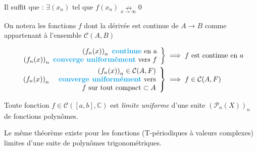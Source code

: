 \documentclass[11pt,a4paper,fleqn,pdftex]{report}
\begin{document}
\begin{theorem}
Il suffit que : 
$\exists (x_n)\text{ tel que }f(x_n)\underset{x\to{}\infty}{\nrightarrow}0$
\end{theorem}
On notera les fonctions $f$ dont la dérivée est continue de $A\to B$ comme appartenant à l'ensemble $\mathcal{C}(A,B)$

\begin{theorem}

\begin{align*}
\left.
\begin{array}{r}
\left(f_n(x)\right)_{n}\text{ \emph{continue} en a}\\
\left(f_n(x)\right)_n\text{ \emph{converge uniformément} vers }f\\
\end{array}\right\rbrace &\implies f\text{ est continue en }a\\
\left.
\begin{array}{r r}
&\left(f_n(x)\right)_{n}\in\mathcal{C}(A,F)\\
\left(f_n(x)\right)_n&\text{ \emph{converge uniformément} vers}\\
&f \text{ sur tout compact} \subset A\\
\end{array}\right\rbrace &\implies f\in \mathcal{C}(A,F)\\
\end{align*}
\end{theorem}
\begin{theorem}
Toute fonction $f\in \mathcal{C}([a,b],\mathbb{C})$ est \emph{limite uniforme} d'une suite $\left(\mathcal{P}_n(X)\right)_n$ de fonctions polynômes.
\end{theorem}
Le même théorème existe pour les fonctions (T-périodiques à valeurs complexes) limites d'une suite de polynômes trigonométriques.
\end{document}
